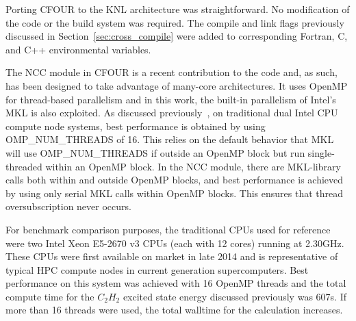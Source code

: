 Porting CFOUR to the KNL architecture was straightforward. No modification of
the code or the build system was required. The compile and link flags
previously discussed in Section~\ref{sec:cross_compile} were added to
corresponding Fortran, C, and C++ environmental variables.

The NCC module in CFOUR is a recent contribution to the code and, as such, has
been designed to take advantage of many-core architectures. It uses OpenMP for
thread-based parallelism and in this work, the built-in parallelism of Intel's
MKL is also exploited. As discussed previously~\cite{ncc:15}, on traditional
dual Intel CPU compute node systems, best performance is obtained by using
OMP\_NUM\_THREADS of 16. This relies on the default behavior that MKL will use
OMP\_NUM\_THREADS if outside an OpenMP block but run single-threaded within an
OpenMP block.  In the NCC module, there are MKL-library calls both within and
outside OpenMP blocks, and best performance is achieved by using only serial
MKL calls within OpenMP blocks. This ensures that thread oversubscription never
occurs.

For benchmark comparison purposes, the traditional CPUs used for reference were two Intel Xeon E5-2670 v3 CPUs
(each with 12 cores) running at 2.30GHz. These CPUs were first available on market in late 2014 and is
representative of typical HPC compute nodes in current generation supercomputers. Best performance on this
system was achieved with 16 OpenMP threads and the total compute time for the $C_2H_2$ excited state energy
discussed previously was 607s.
If more than 16 threads were used, the total walltime for the calculation increases.

